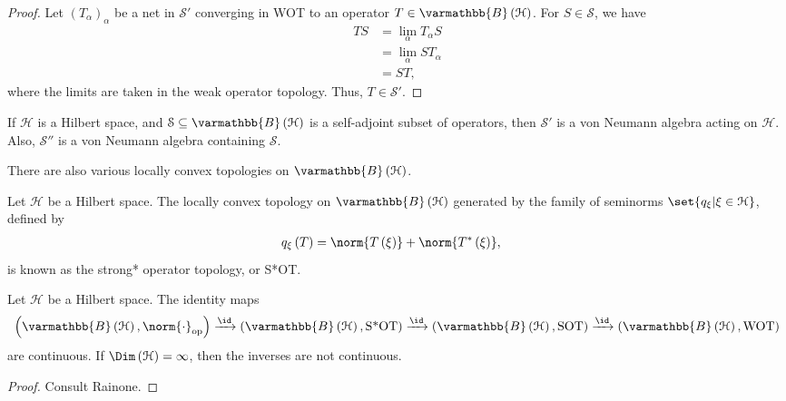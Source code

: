 \documentclass[10pt]{mypackage}
\renewcommand*{\mathbb}[1]{\varmathbb{#1}}
\newcommand{\B}{\mathbb{B}}
\begin{document}
\begin{proof}
  Let $\left(T_{\alpha}\right)_{\alpha}$ be a net in $\mathcal{S}'$ converging in WOT to an operator $T\in \B\left(\mathcal{H}\right)$. For $S\in \mathcal{S}$, we have
  \begin{align*}
    TS &= \lim_{\alpha}T_{\alpha}S\\
       &= \lim_{\alpha}ST_{\alpha}\\
       &= ST,
  \end{align*}
  where the limits are taken in the weak operator topology. Thus, $T\in \mathcal{S}'$.
\end{proof}
\begin{corollary}
  If $\mathcal{H}$ is a Hilbert space, and $\mathcal{S}\subseteq \B\left(\mathcal{H}\right)$ is a self-adjoint subset of operators, then $\mathcal{S}'$ is a von Neumann algebra acting on $\mathcal{H}$. Also, $\mathcal{S}''$ is a von Neumann algebra containing $\mathcal{S}$.
\end{corollary}
There are also various locally convex topologies on $\B\left(\mathcal{H}\right)$.
\begin{definition}
  Let $\mathcal{H}$ be a Hilbert space. The locally convex topology on $\B\left(\mathcal{H}\right)$ generated by the family of seminorms $\set{q_{\xi} | \xi\in \mathcal{H}}$, defined by
  \begin{align*}
    q_{\xi}\left(T\right) &= \norm{T\left(\xi\right)} + \norm{T^{\ast}\left(\xi\right)},
  \end{align*}
  is known as the strong* operator topology, or S*OT.
\end{definition}
\begin{proposition}
  Let $\mathcal{H}$ be a Hilbert space. The identity maps
  \begin{align*}
    \left(\B\left(\mathcal{H}\right),\norm{\cdot}_{\text{op}}\right) \xrightarrow{\id}\left(\B\left(\mathcal{H}\right),\text{S*OT}\right)\xrightarrow{\id}\left(\B\left(\mathcal{H}\right),\text{SOT}\right)\xrightarrow{\id}\left(\B\left(\mathcal{H}\right),\text{WOT}\right)
  \end{align*}
  are continuous. If $\Dim\left(\mathcal{H}\right)=\infty$, then the inverses are not continuous.
\end{proposition}
\begin{proof}
  Consult Rainone.
\end{proof}
\end{document}
